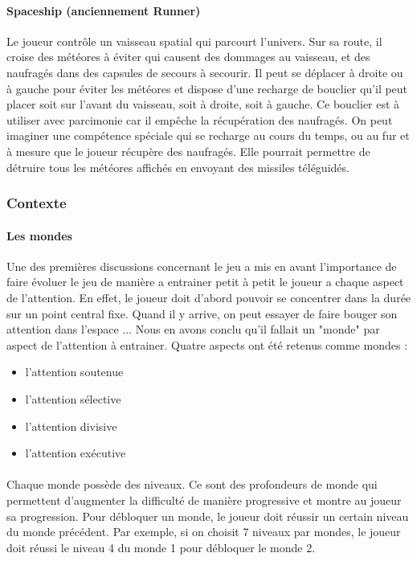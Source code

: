 \paragraph{Spaceship (anciennement Runner)}Le joueur contrôle un vaisseau spatial qui parcourt l'univers. Sur sa route, il croise des météores à éviter qui causent des dommages au
vaisseau, et des naufragés dans des capsules de secours à secourir. Il peut se déplacer à droite ou à gauche pour éviter les météores et dispose d'une recharge de bouclier qu'il peut
placer soit sur l'avant du vaisseau, soit à droite, soit à gauche. Ce bouclier est à utiliser avec parcimonie car il empêche la récupération des naufragés. On peut imaginer une
compétence spéciale qui se recharge au cours du temps, ou au fur et à mesure que le joueur récupère des naufragés. Elle pourrait permettre de détruire tous les météores affichés en
envoyant des missiles téléguidés.


\newpage
\subsubsection{Contexte}

\paragraph{Les mondes}Une des premières discussions concernant le jeu a mis en avant l'importance de faire évoluer le jeu de manière a entrainer petit à petit le joueur a chaque aspect
de l'attention. En effet, le joueur doit d'abord pouvoir se concentrer dans la durée sur un point central fixe. Quand il y arrive, on peut essayer de faire bouger son attention dans
l'espace ... Nous en avons conclu qu'il fallait un "monde" par aspect de l'attention à entrainer. Quatre aspects ont été retenus comme mondes :
\begin{itemize}
\item l'attention soutenue
\item l'attention sélective
\item l'attention divisive
\item l'attention exécutive
\end{itemize}

\paragraph{}Chaque monde possède des niveaux. Ce sont des profondeurs de monde qui permettent d'augmenter la difficulté de manière progressive et montre au joueur sa progression.
Pour débloquer un monde, le joueur doit réussir un certain niveau du monde précédent. Par exemple, si on choisit 7 niveaux par mondes, le joueur doit réussi le niveau 4 du monde 1
pour débloquer le monde 2.


